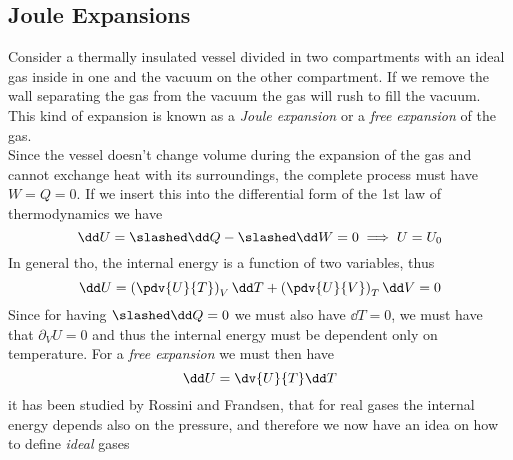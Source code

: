 \documentclass[../qm.tex]{subfiles}
\begin{document}
\subsection{Joule Expansions}
Consider a thermally insulated vessel divided in two compartments with an ideal gas inside in one and the vacuum on the other compartment. If we remove the wall separating the gas from the vacuum the gas will rush to fill the vacuum. This kind of expansion is known as a \textit{Joule expansion} or a \textit{free expansion} of the gas.\\
Since the vessel doesn't change volume during the expansion of the gas and cannot exchange heat with its surroundings, the complete process must have $W=Q=0$. If we insert this into the differential form of the 1st law of thermodynamics we have
\begin{equation}
	\dd U =\slashed\dd Q-\slashed\dd W=0\implies U=U_0
	\label{eq:freeexp.ig}
\end{equation}
In general tho, the internal energy is a function of two variables, thus
\begin{equation*}
	\dd U = \left( \pdv{U}{T} \right)_V\dd T+\left( \pdv{U}{V} \right)_T\dd V=0
\end{equation*}
Since for having $\slashed\dd Q=0$ we must also have $\dd T=0$, we must have that $\partial_V U=0$ and thus the internal energy must be dependent only on temperature. For a \textit{free expansion} we must then have
\begin{equation}
	\dd U = \dv{U}{T}\dd T
	\label{eq:freeexpinte.ig}
\end{equation}
it has been studied by Rossini and Frandsen, that for real gases the internal energy depends also on the pressure, and therefore we now have an idea on how to define \textit{ideal} gases
\end{document}
